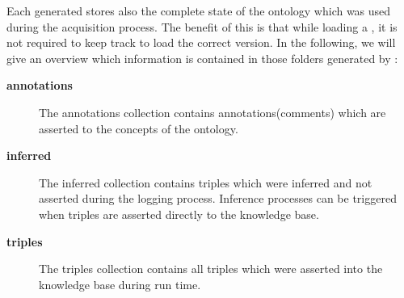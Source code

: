 Each generated \neem stores also the complete state of the \soma ontology which was used during the acquisition process.
The benefit of this is that while loading a \neem, it is not required to keep track to load the correct \soma version.
In the following, we will give an overview which information is contained in those folders generated by \knowrob:


\begin{description}
	\item[\textbf{annotations}] The annotations collection contains annotations(comments) which are asserted to the concepts of the ontology.
	\item[\textbf{inferred}] The inferred collection contains triples which were inferred and not asserted during the logging process. Inference processes can be triggered when triples are asserted directly to the knowledge base.
	\item[\textbf{triples}] The triples collection contains all triples which were asserted into the knowledge base during run time.
\end{description}




